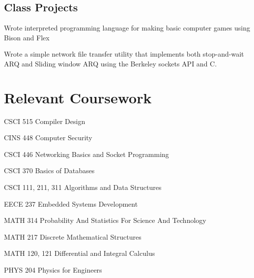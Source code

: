 \documentclass[letterpaper]{article}
\renewenvironment{itemize}{
  \begin{list}{}{
    \setlength{\leftmargin}{1.5em}
  }
}{
  \end{list}
}
\begin{document}
\subsection*{Class Projects}
\begin{itemize}
    \item Wrote interpreted programming language for making basic computer games using Bison and Flex
    \item Wrote a simple network file transfer utility that implements both stop-and-wait ARQ and Sliding window ARQ using the Berkeley sockets API and C.
\end{itemize}

\vspace{0.2in}

\begin{minipage}[t]{0.475\linewidth}
    \section*{Relevant Coursework}
    \begin{itemize}
        \item CSCI 515 Compiler Design
        \item CINS 448 Computer Security
        \item CSCI 446 Networking Basics and Socket Programming
        \item CSCI 370 Basics of Databases
        \item CSCI 111, 211, 311 Algorithms and Data Structures
        \item EECE 237 Embedded Systems Development
        \item MATH 314 Probability And Statistics For Science And Technology
        \item MATH 217 Discrete Mathematical Structures
        \item MATH 120, 121 Differential and Integral Calculus
        \item PHYS 204 Physics for Engineers
    \end{itemize}
\end{minipage}
\hspace{0.5cm}
\end{document}
